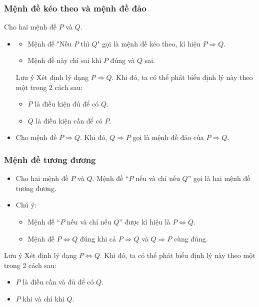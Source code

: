 \subsubsection{Mệnh đề kéo theo và mệnh đề đảo}
	Cho hai mệnh đề $P$ và $Q$.
		\begin{itemize}
			\item[\iconMT] 
				\begin{boxkn}
			\begin{itemize}
				\item  Mệnh đề "Nếu $P$ thì $Q$" gọi là mệnh đề kéo theo, kí hiệu  $P\Rightarrow Q$.
				\item  Mệnh đề này chỉ sai khi $P$ đúng và $Q$ sai.
			\end{itemize}
					\end{boxkn}
				\begin{khung4}{Lưu ý}
					Xét định lý dạng $P\Rightarrow Q$. Khi đó, ta có thể phát biểu định lý này theo một trong 2 cách sau:
					\begin{itemize}
						\item[\ding{172}] $P$ là điều kiện đủ để có $Q$.
						\item[\ding{173}] $Q$ là điều kiện cần để có $P$.
					\end{itemize}
				\end{khung4}
			\item[\iconMT]  Cho mệnh đề $P\Rightarrow Q$. Khi đó, $Q\Rightarrow P$ gọi là mệnh đề đảo của $P\Rightarrow Q$.
			\end{itemize}
\subsubsection{Mệnh đề tương đương}
\begin{itemize}
	\item [\iconMT] Cho hai mệnh đề $P$ và $Q$. Mệnh đề ``$P$ nếu và chỉ nếu $Q$''  gọi là hai mệnh đề tương đương.
	\item [\iconMT] Chú ý:
	\begin{boxkn}
	\begin{itemize}
		\item  Mệnh đề ``$P$ nếu và chỉ nếu $Q$'' được kí hiệu là $P\Leftrightarrow Q$.
		\item 	Mệnh đề $P\Leftrightarrow Q$ đúng khi cả $P\Rightarrow Q$ và $Q\Rightarrow P$ cùng đúng.
	\end{itemize}
	\end{boxkn}
\end{itemize}
			\begin{khung4}{Lưu ý}
				Xét định lý dạng $P \Leftrightarrow Q$. Khi đó, ta có thể phát biểu định lý này theo một trong 2 cách sau:
				\begin{itemize}
					\item[\ding{172}] $P$ là điều cần và đủ để có $Q$.
					\item[\ding{173}] $P$ khi và chỉ khi $Q$.
				\end{itemize}
			\end{khung4}
